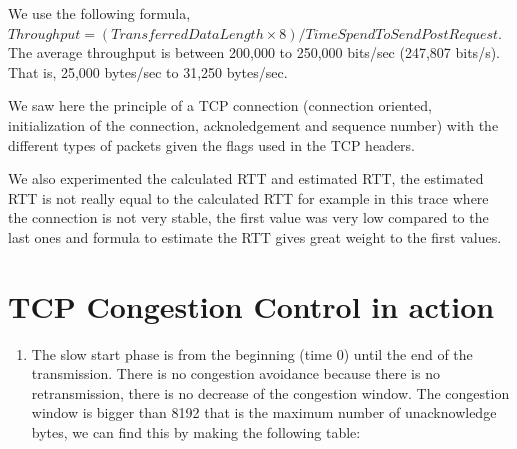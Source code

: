 \documentclass[a4paper,11pt,final]{report}
\begin{document}
We use the following formula,
\(Throughput = (TransferredDataLength \times 8)/TimeSpendToSendPostRequest\).
The average throughput is between 200,000 to 250,000 bits/sec (247,807
bits/s). That is, 25,000 bytes/sec to 31,250 bytes/sec.

We saw here the principle of a TCP connection (connection oriented,
initialization of the connection, acknoledgement and sequence number)
with the different types of packets given the flags used in the TCP
headers.

We also experimented the calculated RTT and estimated RTT, the estimated
RTT is not really equal to the calculated RTT for example in this trace
where the connection is not very stable, the first value was very low
compared to the last ones and formula to estimate the RTT gives great
weight to the first values.

\chapter{TCP Congestion Control in action}

\begin{enumerate}
\def\labelenumi{\arabic{enumi}.}
\setcounter{enumi}{12}
\item
  The slow start phase is from the beginning (time 0) until the end of
  the transmission. There is no congestion avoidance because there is no
  retransmission, there is no decrease of the congestion window. The
  congestion window is bigger than 8192 that is the maximum number of
  unacknowledge bytes, we can find this by making the following table:
\end{enumerate}
\end{document}
